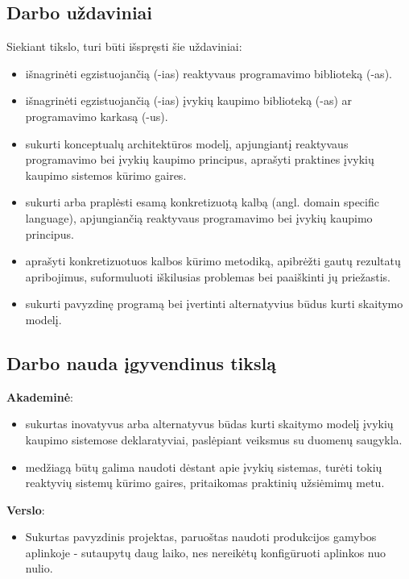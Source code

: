 
\subsection{Darbo uždaviniai}

  Siekiant tikslo, turi būti išspręsti šie uždaviniai:

\begin{itemize}
  \item išnagrinėti egzistuojančią (-ias) reaktyvaus programavimo biblioteką (-as).
  \item išnagrinėti egzistuojančią (-ias) įvykių kaupimo biblioteką (-as) ar programavimo karkasą (-us).
  \item sukurti konceptualų architektūros modelį, apjungiantį reaktyvaus programavimo bei įvykių kaupimo principus, aprašyti praktines įvykių kaupimo sistemos kūrimo gaires.
  \item sukurti arba praplėsti esamą konkretizuotą kalbą (angl. domain specific language), apjungiančią reaktyvaus programavimo bei įvykių kaupimo principus.
  \item aprašyti konkretizuotuos kalbos kūrimo metodiką, apibrėžti gautų rezultatų apribojimus, suformuluoti iškilusias problemas bei paaiškinti jų priežastis.
  \item sukurti pavyzdinę programą bei įvertinti alternatyvius būdus kurti skaitymo modelį.
\end{itemize}

\subsection{Darbo nauda įgyvendinus tikslą}

\textbf{Akademinė}:

\begin{itemize}
  \item sukurtas inovatyvus arba alternatyvus būdas kurti skaitymo modelį įvykių kaupimo sistemose deklaratyviai, paslėpiant veiksmus su duomenų saugykla.
  \item medžiagą būtų galima naudoti dėstant apie įvykių sistemas, turėti  tokių reaktyvių sistemų kūrimo gaires, pritaikomas praktinių užsiėmimų metu.
\end{itemize}

\textbf{Verslo}:

\begin{itemize}
  \item Sukurtas pavyzdinis projektas, paruoštas naudoti produkcijos gamybos aplinkoje - sutaupytų daug laiko, nes nereikėtų konfigūruoti aplinkos nuo nulio.
\end{itemize}

